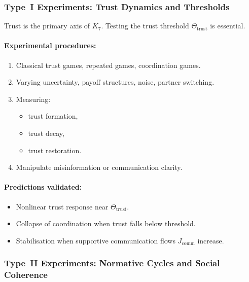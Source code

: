 \subsubsection{Type~I Experiments: Trust Dynamics and Thresholds}

Trust is the primary axis of $K_7$.  
Testing the trust threshold $\Theta_{\mathrm{trust}}$ is essential.

\paragraph{Experimental procedures:}

\begin{enumerate}
    \item Classical trust games, repeated games, coordination games.
    \item Varying uncertainty, payoff structures, noise, partner switching.
    \item Measuring:
          \begin{itemize}
              \item trust formation,
              \item trust decay,
              \item trust restoration.
          \end{itemize}
    \item Manipulate misinformation or communication clarity.
\end{enumerate}

\paragraph{Predictions validated:}

\begin{itemize}
    \item Nonlinear trust response near 
          $\Theta_{\mathrm{trust}}$.
    \item Collapse of coordination when trust falls below threshold.
    \item Stabilisation when supportive communication flows $J_{\mathrm{comm}}$ increase.
\end{itemize}



\subsubsection{Type~II Experiments: Normative Cycles and Social Coherence}

